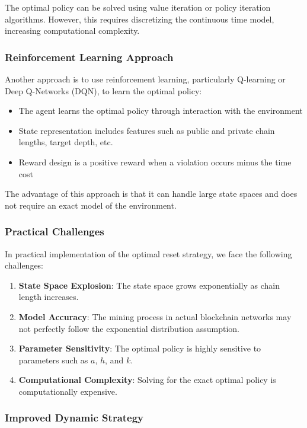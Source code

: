 \documentclass[12pt,a4paper]{article}
\begin{document}
The optimal policy can be solved using value iteration or policy iteration algorithms. However, this requires discretizing the continuous time model, increasing computational complexity.

\subsubsection{Reinforcement Learning Approach}

Another approach is to use reinforcement learning, particularly Q-learning or Deep Q-Networks (DQN), to learn the optimal policy:

\begin{itemize}
    \item The agent learns the optimal policy through interaction with the environment
    \item State representation includes features such as public and private chain lengths, target depth, etc.
    \item Reward design is a positive reward when a violation occurs minus the time cost
\end{itemize}

The advantage of this approach is that it can handle large state spaces and does not require an exact model of the environment.

\subsubsection{Practical Challenges}

In practical implementation of the optimal reset strategy, we face the following challenges:

\begin{enumerate}
    \item \textbf{State Space Explosion}: The state space grows exponentially as chain length increases.
    \item \textbf{Model Accuracy}: The mining process in actual blockchain networks may not perfectly follow the exponential distribution assumption.
    \item \textbf{Parameter Sensitivity}: The optimal policy is highly sensitive to parameters such as $a$, $h$, and $k$.
    \item \textbf{Computational Complexity}: Solving for the exact optimal policy is computationally expensive.
\end{enumerate}

\subsubsection{Improved Dynamic Strategy}
\end{document}
